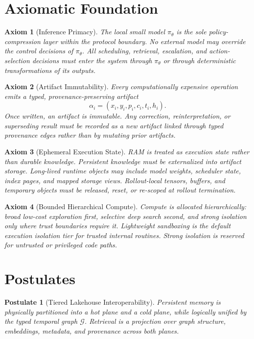 \documentclass[11pt]{article}
\newtheorem{axiom}{Axiom}
\newtheorem{postulate}{Postulate}
\theoremstyle{definition}
\newcommand{\graph}{\mathcal{G}}
\begin{document}
\section{Axiomatic Foundation}

\begin{axiom}[Inference Primacy]
The local small model \(\pi_{\theta}\) is the sole policy-compression layer within the protocol boundary. No external model may override the control decisions of \(\pi_{\theta}\). All scheduling, retrieval, escalation, and action-selection decisions must enter the system through \(\pi_{\theta}\) or through deterministic transformations of its outputs.
\end{axiom}

\begin{axiom}[Artifact Immutability]
Every computationally expensive operation emits a typed, provenance-preserving artifact
\[
\alpha_i = (x_i, y_i, p_i, c_i, t_i, h_i).
\]
Once written, an artifact is immutable. Any correction, reinterpretation, or superseding result must be recorded as a new artifact linked through typed provenance edges rather than by mutating prior artifacts.
\end{axiom}

\begin{axiom}[Ephemeral Execution State]
RAM is treated as execution state rather than durable knowledge. Persistent knowledge must be externalized into artifact storage. Long-lived runtime objects may include model weights, scheduler state, index pages, and mapped storage views. Rollout-local tensors, buffers, and temporary objects must be released, reset, or re-scoped at rollout termination.
\end{axiom}

\begin{axiom}[Bounded Hierarchical Compute]
Compute is allocated hierarchically: broad low-cost exploration first, selective deep search second, and strong isolation only where trust boundaries require it. Lightweight sandboxing is the default execution isolation tier for trusted internal routines. Strong isolation is reserved for untrusted or privileged code paths.
\end{axiom}

\section{Postulates}

\begin{postulate}[Tiered Lakehouse Interoperability]
Persistent memory is physically partitioned into a hot plane and a cold plane, while logically unified by the typed temporal graph \(\graph\). Retrieval is a projection over graph structure, embeddings, metadata, and provenance across both planes.
\end{postulate}
\end{document}
